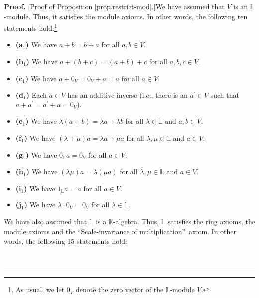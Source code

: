 \documentclass[numbers=enddot,12pt,final,onecolumn,notitlepage]{scrartcl}%
\theoremstyle{definition}
\newenvironment{fineprint}{\begin{small}}{\end{small}}
\newenvironment{proof}[1][Proof]{\noindent\textbf{#1.} }{\ \rule{0.5em}{0.5em}}
\begin{document}
\begin{fineprint}
\begin{proof}
[Proof of Proposition \ref{prop.restrict-mod}.]We have assumed that $V$ is an
$\mathbb{L}$-module. Thus, it satisfies the module axioms. In other words, the
following ten statements hold:\footnote{As usual, we let $0_{V}$ denote the
zero vector of the $\mathbb{L}$-module $V$.}

\begin{itemize}
\item \textbf{(a}$_{1}$\textbf{)} We have $a+b=b+a$ for all $a,b\in V$.

\item \textbf{(b}$_{1}$\textbf{)} We have $a+\left(  b+c\right)  =\left(
a+b\right)  +c$ for all $a,b,c\in V$.

\item \textbf{(c}$_{1}$\textbf{)} We have $a+0_{V}=0_{V}+a=a$ for all $a\in V$.

\item \textbf{(d}$_{1}$\textbf{)} Each $a\in V$ has an additive inverse (i.e.,
there is an $a^{\prime}\in V$ such that $a+a^{\prime}=a^{\prime}+a=0_{V}$).

\item \textbf{(e}$_{1}$\textbf{)} We have $\lambda\left(  a+b\right)  =\lambda
a+\lambda b$ for all $\lambda\in\mathbb{L}$ and $a,b\in V$.

\item \textbf{(f}$_{1}$\textbf{)} We have $\left(  \lambda+\mu\right)
a=\lambda a+\mu a$ for all $\lambda,\mu\in\mathbb{L}$ and $a\in V$.

\item \textbf{(g}$_{1}$\textbf{)} We have $0_{\mathbb{L}}a=0_{V}$ for all
$a\in V$.

\item \textbf{(h}$_{1}$\textbf{)} We have $\left(  \lambda\mu\right)
a=\lambda\left(  \mu a\right)  $ for all $\lambda,\mu\in\mathbb{L}$ and $a\in
V$.

\item \textbf{(i}$_{1}$\textbf{)} We have $1_{\mathbb{L}}a=a$ for all $a\in V$.

\item \textbf{(j}$_{1}$\textbf{)} We have $\lambda\cdot0_{V}=0_{V}$ for all
$\lambda\in\mathbb{L}$.
\end{itemize}

We have also assumed that $\mathbb{L}$ is a $\mathbb{K}$-algebra. Thus,
$\mathbb{L}$ satisfies the ring axioms, the module axioms and the
\textquotedblleft Scale-invariance of multiplication\textquotedblright\ axiom.
In other words, the following 15 statements hold:


\end{proof}
\end{fineprint}
\end{document}
